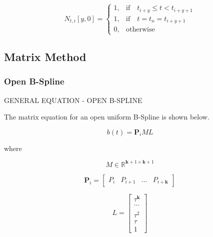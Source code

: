 \documentclass{article}
\begin{document}
\begin{equation} \label{eq:table evaluation clamped zeros}
      N_{t,i}[y,0] =   \begin{cases} 1, &  \text{if} \quad t_{i+y} \leq t < t_{i+y+1} \\
      1, &  \text{if} \quad t = t_n = t_{i+y+1} \\
                            0, & \text{otherwise} \end{cases}
  \end{equation}

\subsection{Matrix Method} \label{matrix mehtod}

\subsubsection{Open B-Spline}
    
GENERAL EQUATION - OPEN B-SPLINE

\hspace{1cm}

The matrix equation for an open uniform B-Spline is shown below.
    
    \begin{equation}
        b(t) = \textbf{P}_i M L
    \end{equation}

        where
    
    \begin{equation}
    M \in \mathbb{R}^{\textbf{k}+1 \times \textbf{k}+1}
    \end{equation}
        
    \begin{equation}
        \textbf{P}_i = \begin{bmatrix} P_{i} & P_{i+1} & ... & P_{i+\textbf{k}}\end{bmatrix}
    \end{equation}
    
    \begin{equation}
        L = \begin{bmatrix} \tau^{\textbf{k}} \\ ... \\ \\ \tau^2 \\ \tau \\ 1 \end{bmatrix}
    \end{equation}
    
\end{document}
